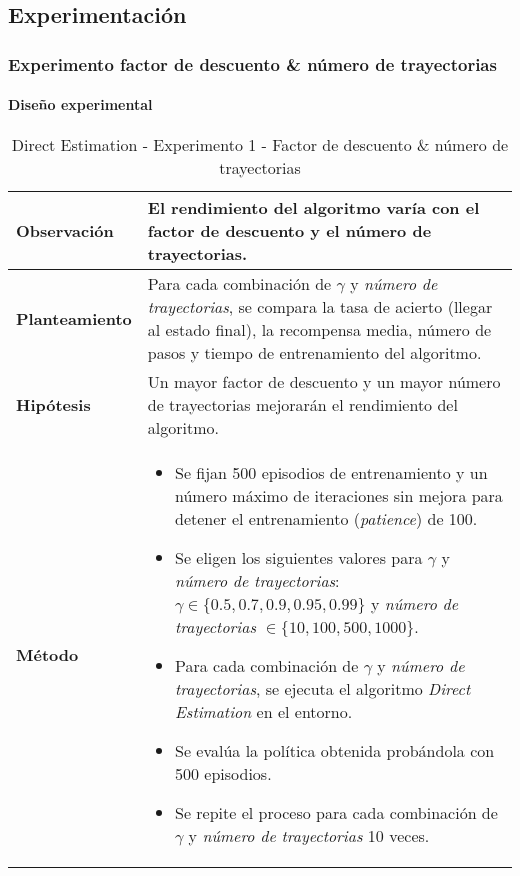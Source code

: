 \subsection{Experimentación}

\subsubsection{Experimento factor de descuento \& número de trayectorias}

\paragraph{Diseño experimental}
\begin{table}[H]
    \centering
    \begin{tabularx}{\textwidth}{|p{4cm}|X|} %
        \hline %
        \textbf{Observación} & El rendimiento del algoritmo varía con el factor de descuento y el número de trayectorias.
        \\ \hline
        \textbf{Planteamiento} & Para cada combinación de \(\gamma\) y \textit{número de trayectorias}, se compara la tasa de acierto (llegar al estado final), la recompensa media, número de pasos y tiempo de entrenamiento del algoritmo.
        \\ \hline
        \textbf{Hipótesis} & Un mayor factor de descuento y un mayor número de trayectorias mejorarán el rendimiento del algoritmo.
        \\ \hline
        \textbf{Método} & 
        \begin{itemize}
            \item Se fijan 500 episodios de entrenamiento y un número máximo de iteraciones sin mejora para detener el entrenamiento (\textit{patience}) de 100.
            \item Se eligen los siguientes valores para \(\gamma\) y \textit{número de trayectorias}: \(\gamma \in \{0.5, 0.7, 0.9, 0.95, 0.99\}\) y \textit{número de trayectorias} \(\in \{10, 100, 500, 1000\}\).
            \item Para cada combinación de \(\gamma\) y \textit{número de trayectorias}, se ejecuta el algoritmo \textit{Direct Estimation} en el entorno.
            \item Se evalúa la política obtenida probándola con 500 episodios.
            \item Se repite el proceso para cada combinación de \(\gamma\) y \textit{número de trayectorias} 10 veces.
        \end{itemize}
        \\ \hline
    \end{tabularx}
    \caption{Direct Estimation - Experimento 1 - Factor de descuento \& número de trayectorias}
    \label{tab:diseñoDirectEstimationExp1}
\end{table}

